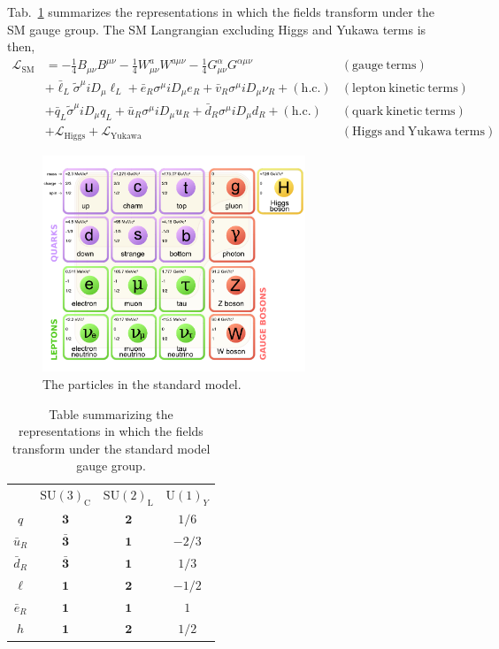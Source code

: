 Tab.~\ref{tab:representations} summarizes the
representations in which the fields transform under the SM
gauge group. The SM Langrangian
excluding Higgs and Yukawa terms is then,
\begin{align}
\mathcal{L}_{\mathrm{SM}} &= -\frac{1}{4}B_{\mu\nu}B^{\mu\nu} -\frac{1}{4}W^{a}_{\mu\nu}W^{a\mu\nu} - \frac{1}{4}G^{\alpha}_{\mu\nu}G^{\alpha\mu\nu}
  & \mathrm{(gauge~terms)}\nonumber\\
& +\bar\ell_L\tilde\sigma^{\mu}iD_{\mu}\ell_L +
   \bar e_R\sigma^{\mu}iD_{\mu}e_R + \bar v_R
   \sigma^{\mu}iD_{\mu}\nu_R + (\mathrm{h.c.})& \mathrm{(lepton~kinetic~terms)}\nonumber\\
& +\bar q_L\tilde\sigma^{\mu}iD_{\mu}q_L +
   \bar u_R\sigma^{\mu}iD_{\mu}u_R + \bar d_R
   \sigma^{\mu}iD_{\mu}d_R + (\mathrm{h.c.})& \mathrm{(quark~kinetic~terms)}\nonumber\\
& +\mathcal L_{\mathrm{Higgs}} +\mathcal L_{\mathrm{Yukawa}} &  \mathrm{(Higgs~and~Yukawa~terms)}
\label{eqn:lsm}
\end{align}

\begin{figure}
\centering
\includegraphics[width=0.7\textwidth]{figs/theory/standardmodel.pdf}
\caption{\label{fig:standardmodel} The particles in the standard model.}
\end{figure}

\begin{table}
\centering
\begin{tabular}{c|ccc}
&$\mathrm{SU(3)}_{\mathrm{C}}$&$\mathrm{SU(2)}_{\mathrm{L}}$&$\mathrm{U(1)}_Y$ \\
$q$ & $\mathbf{3}$ & $\mathbf{2}$ & $1/6$\\
$\bar u_R$ & $\mathbf{\bar 3}$ & $\mathbf{1}$ & $-2/3$\\
$\bar d_R$ & $\mathbf{\bar 3}$ & $\mathbf{1}$ & $1/3$\\
$\ell$ & $\mathbf{1}$ & $\mathbf{2}$ & $-1/2$\\
$\bar e_R$ & $\mathbf{1}$ & $\mathbf{1}$ & $1$\\\hline
$h$ & $\mathbf{1}$ & $\mathbf{2}$ & $1/2$
\end{tabular}
\caption{\label{tab:representations} Table summarizing the
    representations in which the fields transform under the standard
    model gauge group.}
\end{table}


